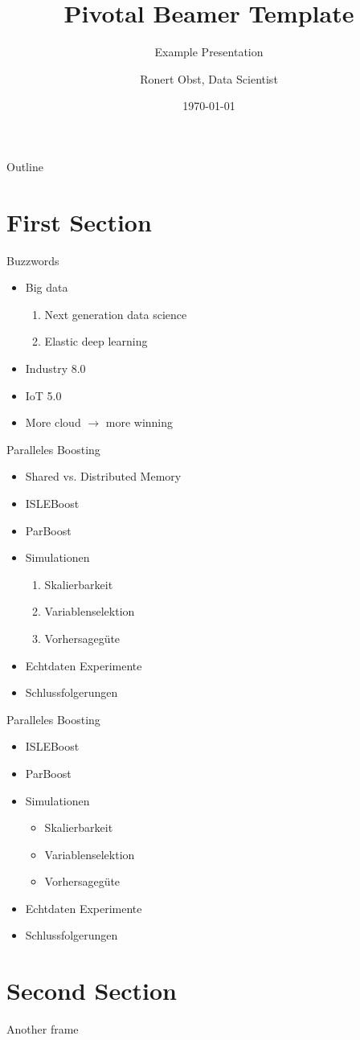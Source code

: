 \documentclass[english,presentation]{pivotalbeamer}
\subtitle{Example Presentation}
\author{Ronert Obst, Data Scientist}
\date{\today}
\title{Pivotal Beamer Template}
\begin{document}
\maketitle
\begin{frame}{Outline}
\tableofcontents
\end{frame}

\section{First Section}
\label{sec-1}
\begin{frame}[fragile,label=sec-1-1]{Buzzwords}
\begin{itemize}
\item Big data
\begin{enumerate}
\item Next generation data science
\item Elastic deep learning
\end{enumerate}
\item Industry 8.0
\item IoT 5.0
\item More cloud $\rightarrow$ more winning
\end{itemize}
\end{frame}

\begin{frame}[fragile,label=sec-1-2]{Paralleles Boosting}
\begin{itemize}
\item Shared vs. Distributed Memory
\item ISLEBoost
\item ParBoost
\item Simulationen
\begin{enumerate}
\item Skalierbarkeit
\item Variablenselektion
\item Vorhersagegüte
\end{enumerate}
\item Echtdaten Experimente
\item Schlussfolgerungen
\end{itemize}
\end{frame}

\begin{frame}[fragile,label=sec-1-3]{Paralleles Boosting}
\begin{itemize}
\item ISLEBoost
\item ParBoost
\item Simulationen
\begin{itemize}
\item Skalierbarkeit
\item Variablenselektion
\item Vorhersagegüte
\end{itemize}
\item Echtdaten Experimente
\item Schlussfolgerungen
\end{itemize}
\end{frame}

\section{Second Section}
\label{sec-2}
\begin{frame}[fragile,label=sec-2-1]{Another frame}
\end{frame}
\end{document}
